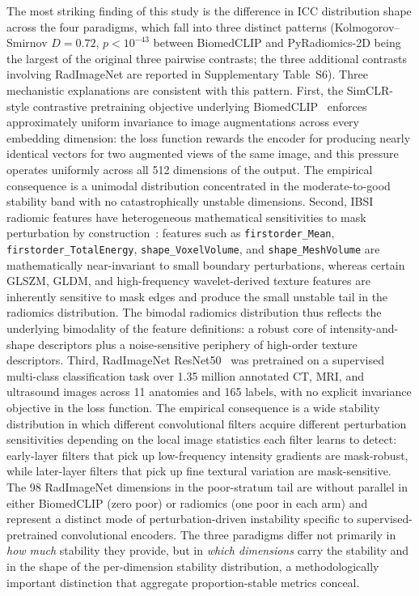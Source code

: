 The most striking finding of this study is the difference in ICC distribution shape across the four paradigms, which fall into three distinct patterns (Kolmogorov--Smirnov $D = 0.72$, $p < 10^{-43}$ between BiomedCLIP and PyRadiomics-2D being the largest of the original three pairwise contrasts; the three additional contrasts involving RadImageNet are reported in Supplementary Table~S6). Three mechanistic explanations are consistent with this pattern. First, the SimCLR-style contrastive pretraining objective underlying BiomedCLIP~\cite{zhang2024biomedclip} enforces approximately uniform invariance to image augmentations across every embedding dimension: the loss function rewards the encoder for producing nearly identical vectors for two augmented views of the same image, and this pressure operates uniformly across all 512 dimensions of the output. The empirical consequence is a unimodal distribution concentrated in the moderate-to-good stability band with no catastrophically unstable dimensions. Second, IBSI radiomic features have heterogeneous mathematical sensitivities to mask perturbation by construction~\cite{zwanenburg2020}: features such as \texttt{firstorder\_Mean}, \texttt{firstorder\_TotalEnergy}, \texttt{shape\_VoxelVolume}, and \texttt{shape\_MeshVolume} are mathematically near-invariant to small boundary perturbations, whereas certain GLSZM, GLDM, and high-frequency wavelet-derived texture features are inherently sensitive to mask edges and produce the small unstable tail in the radiomics distribution. The bimodal radiomics distribution thus reflects the underlying bimodality of the feature definitions: a robust core of intensity-and-shape descriptors plus a noise-sensitive periphery of high-order texture descriptors. Third, RadImageNet ResNet50~\cite{mei2022radimagenet} was pretrained on a supervised multi-class classification task over 1.35 million annotated CT, MRI, and ultrasound images across 11 anatomies and 165 labels, with no explicit invariance objective in the loss function. The empirical consequence is a wide stability distribution in which different convolutional filters acquire different perturbation sensitivities depending on the local image statistics each filter learns to detect: early-layer filters that pick up low-frequency intensity gradients are mask-robust, while later-layer filters that pick up fine textural variation are mask-sensitive. The 98 RadImageNet dimensions in the poor-stratum tail are without parallel in either BiomedCLIP (zero poor) or radiomics (one poor in each arm) and represent a distinct mode of perturbation-driven instability specific to supervised-pretrained convolutional encoders. The three paradigms differ not primarily in \emph{how much} stability they provide, but in \emph{which dimensions} carry the stability and in the shape of the per-dimension stability distribution, a methodologically important distinction that aggregate proportion-stable metrics conceal.

